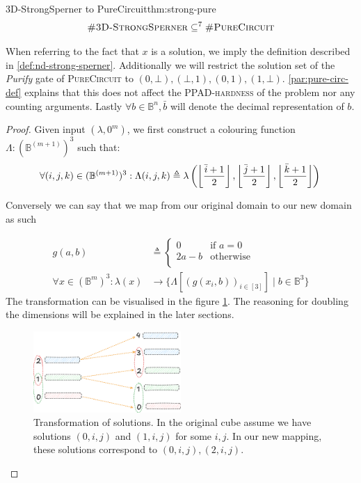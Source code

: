 \begin{theorembox}{3D-StrongSperner to PureCircuit}{thm:strong-pure}
    $$
    \textnormal{\textsc{\#3D-StrongSperner}} \subseteq^{7} \textnormal{\textsc{\#PureCircuit}}
    $$
\end{theorembox}

When referring to the fact that $x$ is a solution, we imply the definition described in  \ref{def:nd-strong-sperner}.
Additionally we will restrict the solution set of the \textit{Purify} gate of \textsc{PureCircuit}
to $(0,\bot),(\bot, 1), (0,1), (1, \bot)$. \ref{par:pure-circ-def} explains that this
does not affect the \textsc{PPAD-hardness} of the problem nor any counting arguments.
Lastly $\forall b \in \mathbb{B}^n, \bar{b}$ will denote the decimal representation of $b$.

\begin{proof} 
    Given input $(\lambda, 0^m)$, we first construct a colouring function $\Lambda: (\mathbb{B}^{(m+1)})^3$ such that:
$$
\forall (i,j,k) \in (\mathbb{B}^{(m+1)})^3: \Lambda(i,j,k) \triangleq 
\lambda\left( \left\lfloor  \frac{{\bar{i}+1}}{2}  \right\rfloor, \left\lfloor  \frac{{\bar{j}+1}}{2} \right\rfloor, \left\lfloor  \frac{{\bar{k}+1}}{2} \right\rfloor \right)  \\
$$

Conversely we can say that we map from our original domain to our new domain as such

\begin{align}
    g(a, b) &\triangleq \begin{cases}
        0 &\text{if } a = 0 \\
        2a - b &\text{otherwise}\\
    \end{cases} \\
        \forall  x \in (\mathbb{B}^{m})^3: \lambda(x) &\to \{\Lambda[(g(x_i,b))_{i \in [3]}] \mid b \in \mathbb{B}^{3}\}
\label{eq:trans-eq}
\end{align}
The transformation can be visualised in the figure \ref{fig:main-proof:set_mapping}.
The reasoning for doubling the dimensions will be explained in the later sections.

\begin{figure}[h!]
    \centering
    \includegraphics[width=0.5\textwidth]{assets/1751381227.png}
\caption{Transformation of solutions. In the original cube assume we have solutions $(0, i,j)$ and $(1, i,j)$ for some $i,j$. In our new mapping, these solutions correspond to
$(0, i,j), (2,i,j)$.}
    \label{fig:main-proof:set_mapping}
\end{figure}


\end{proof}
